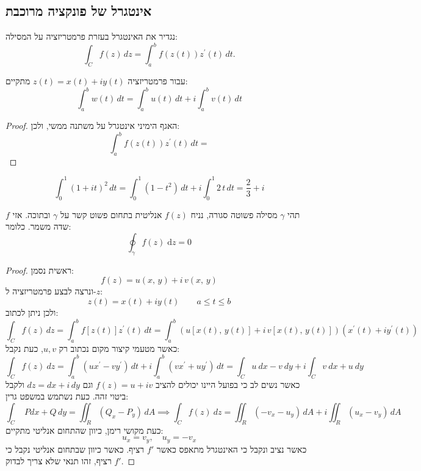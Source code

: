 \documentclass{tstextbook}
\begin{document}
\subsection{אינטגרל של פונקציה מרוכבת}

\begin{definition}
נגדיר את האינטגרל בעזרת פרמטריזציה על המסילה:
$$\int_{C}f(z)\,d z=\int_{a}^{b}f\left(z(t)\right)z^{\prime}(t)\,d t.$$

\end{definition}
\begin{proposition}
עבור פרמטריזציה \(z(t)=x(t)+iy(t)\) מתקיים:
$$\int_{a}^{b}w(t)\,d t=\int_{a}^{b}u(t)\,d t+i\int_{a}^{b}v(t)\,d t$$

\end{proposition}
\begin{proof}
האגף הימיני אינטגרל על משתנה ממשי, ולכן:
$$\int_{a}^{b}f\left(z(t)\right)z^{\prime}(t)\,d t=$$

\end{proof}
\begin{example}
$$\int_{0}^{1}(1+i t)^{2}\,d t=\int_{0}^{1}(1-t^{2})\,d t+i\int_{0}^{1}2\,t\,d t={\frac{2}{3}}+i$$

\end{example}
\begin{theorem}
תהי \(\gamma\) מסילה פשוטה סגורה, נניח \(f(z)\) אנליטית בתחום פשוט קשר על \(\gamma\) ובתוכה. אזי \(f\) שדה משמר. כלומר:
$$\oint_{\gamma}f(z)\;\mathrm{d}z=0$$

\end{theorem}
\begin{proof}
ראשית נסמן:
$$f(z)=u(x,\,y)+i\,v(x,\,y)$$
ונרצה לבצע פרמטריזציה ל-\(z\):
$$z(t)=x(t)+i y(t) \qquad  a\leq t\leq b$$
ולכן ניתן לכתוב:
$$\int_{C}f(z)\,d z=\int_{a}^{b}f[z(t)]z^{\prime}(t)\,d t= \int_{a}^{b} \left( u\left[ x(t),\,y(t) \right]+i\,v\left[ x(t),\,y(t) \right] \right)(x^{\prime}(t)+i y^{\prime}(t))$$
כאשר מטעמי קיצור מקום נכתוב רק \(u,v\), כעת נקבל:
$$\int_{C}f(z)\ d z=\int_{a}^{b}(u x^{\prime}-v y^{\prime})\,d t+i\int_{a}^{b}(v x^{\prime}+u y^{\prime})\,d t=\int_{C}u\ d x-v\ d y+i\int_{C}v\ d x+u\ d y$$
כאשר נשים לב כי בפועל היינו יכולים להציב \(f(z)=u+iv\) וגם \(dz=dx+i\,dy\) ולקבל ביטוי זהה.
כעת נשתמש במשפט גרין:
$$\int_{C}\,\,P d x+Q\,d y=\iint_{R}(Q_{x}-P_{y})\,d A \implies \int_{C}f(z)\ d z=\iint_{R}(-v_{x}-u_{y})\,d A+i\iint_{R}(u_{x}-v_{y})\,d A$$
כעת מקושי רימן, כיוון שהתחום אנליטי מתקיים:
$$u_{x}=v_{y},\quad u_{y}=-v_{x}$$
כאשר נציב ונקבל כי האינטגרל מתאפס כאשר \(f'\) רציף. כאשר כיוון שבתחום אנליטי נקבל כי \(f'\) רציף, זהו תנאי שלא צריך לבדוק.

\end{proof}
\end{document}
